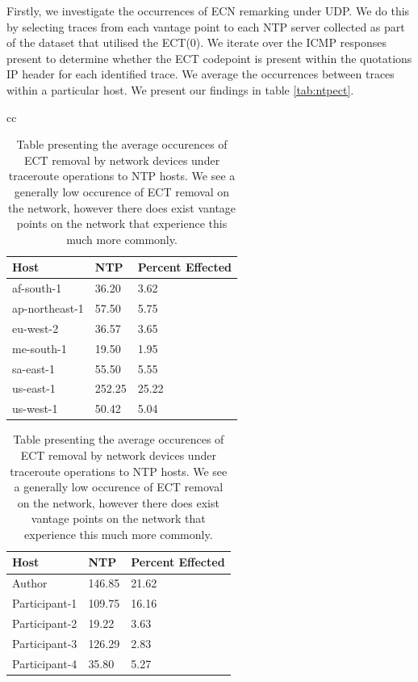 \documentclass{l4proj}
\begin{document}
Firstly, we investigate the occurrences of ECN remarking under UDP. We do this by selecting traces from each vantage point to each NTP server collected as part of the dataset that utilised the ECT(0). We iterate over the ICMP responses present to determine whether the ECT codepoint is present within the quotations IP header for each identified trace. We average the occurrences between traces within a particular host. We present our findings in table \ref{tab:ntpect}.

\begin{table}[H]
\begin{tabular}{cc}
\begin{minipage}{.5\linewidth}
\begin{tabular}{|l|l|l|}
\hline
Host           & NTP    & Percent Effected \\ \hline
af-south-1     & 36.20  & 3.62             \\ \hline
ap-northeast-1 & 57.50  & 5.75             \\ \hline
eu-west-2      & 36.57  & 3.65             \\ \hline
me-south-1     & 19.50  & 1.95             \\ \hline
sa-east-1      & 55.50  & 5.55             \\ \hline
us-east-1      & 252.25 & 25.22            \\ \hline
us-west-1      & 50.42  & 5.04             \\ \hline
\end{tabular}
\end{minipage}

\begin{minipage}{.5\linewidth}
\begin{tabular}{|l|l|l|}
\hline
Host          & NTP    & Percent Effected \\ \hline
Author        & 146.85 & 21.62            \\ \hline
Participant-1 & 109.75 & 16.16            \\ \hline
Participant-2 & 19.22  & 3.63             \\ \hline
Participant-3 & 126.29 & 2.83            \\ \hline
Participant-4 & 35.80  & 5.27             \\ \hline
\end{tabular}
\end{minipage}
\end{tabular}

\caption{Table presenting the average occurences of ECT removal by network devices under traceroute operations to NTP hosts. We see a generally low occurence of ECT removal on the network, however there does exist vantage points on the network that experience this much more commonly.}
\label{table:ntpect}

\end{table}
\end{document}
